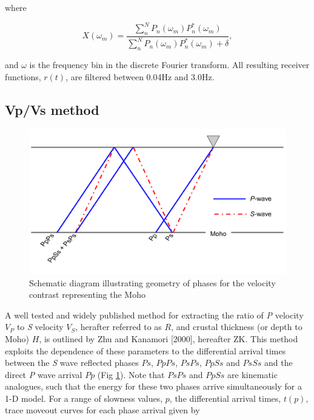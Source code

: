 \documentclass[draft, 12pt]{article}
\begin{document}
\noindent where

\begin{equation}
  X(\omega_m) = \frac {\sum_n^N P_n(\omega_m)P_n^*(\omega_m)} {\sum_n^N P_n(\omega_m)P_n^*(\omega_m) + \delta},
\end{equation}

\noindent and $\omega$ is the frequency bin in the discrete Fourier transform. All resulting receiver functions, $r(t)$, are filtered between 0.04Hz and 3.0Hz.

\subsection{Vp/Vs method} \label{section:VpVsMethod}

\begin{figure}
  \centering
    \includegraphics[width=\textwidth]{reflectedPhases}
  \caption{Schematic diagram illustrating geometry of phases for the velocity contrast representing the Moho}
  \label{fig:reflectedPhases}
\end{figure}


A well tested and widely published method for extracting the ratio of {\it P} velocity $V_P$ to {\it S} velocity $V_S$, herafter referred to as $R$, and crustal thickness (or depth to Moho) $H$, is outlined by Zhu and Kanamori [2000], hereafter ZK. This method exploits the dependence of these parameters to the differential arrival times between the {\it S} wave reflected phases $Ps$, $PpPs$, $PsPs$, $PpSs$ and $PsSs$ and the direct {\it P} wave arrival $Pp$ (Fig \ref{fig:reflectedPhases}). Note that $PsPs$ and $PpSs$ are kinematic analogues, such that the energy for these two phases arrive simultaneously for a 1-D model. For a range of slowness values, $p$, the differential arrival times, $t(p)$, trace moveout curves for each phase arrival given by
\end{document}
